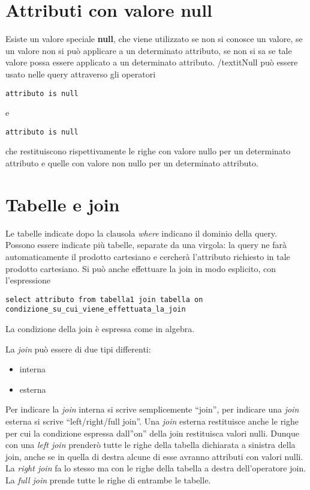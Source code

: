 \documentclass[\main/main.tex]{subfiles}
\begin{document}
\section{Attributi con valore null}
Esiste un valore speciale \textbf{null}, che viene utilizzato se non si conosce un valore, se un valore non si può applicare a un determinato attributo, se non si sa se tale valore possa essere applicato a un determinato attributo.
/textit{Null} può essere usato nelle query attraverso gli operatori
\begin{verbatim}
attributo is null
\end{verbatim}
e
\begin{verbatim}
attributo is null
\end{verbatim}
che restituiscono rispettivamente le righe con valore nullo per un determinato attributo e quelle con valore non nullo per un determinato attributo.

\section{Tabelle e join}
Le tabelle indicate dopo la clausola \textit{where} indicano il dominio della query.
Possono essere indicate più tabelle, separate da una virgola: la query ne farà automaticamente il prodotto cartesiano e cercherà l'attributo richiesto in tale prodotto cartesiano.
Si può anche effettuare la join in modo esplicito, con l'espressione

\begin{verbatim}
select attributo from tabella1 join tabella on condizione_su_cui_viene_effettuata_la_join
\end{verbatim}
La condizione della join è espressa come in algebra.

La \textit{join} può essere di due tipi differenti:
\begin{itemize}
  \item interna
  \item esterna
\end{itemize}
Per indicare la \textit{join} interna si scrive semplicemente ``join'', per indicare una \textit{join} esterna si scrive ``left/right/full join''.
Una \textit{join} esterna restituisce anche le righe per cui la condizione espressa dall''on'' della join restituisca valori nulli.
Dunque con una \textit{left join} prenderò tutte le righe della tabella dichiarata a sinistra della join, anche se in quella di destra alcune di esse avranno attributi con valori nulli.
La \textit{right join} fa lo stesso ma con le righe della tabella a destra dell'operatore join.
La \textit{full join} prende tutte le righe di entrambe le tabelle.
\end{document}
